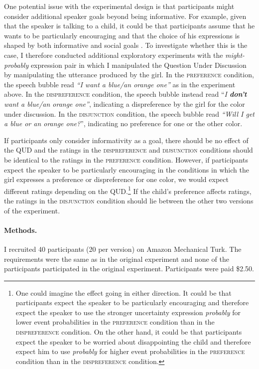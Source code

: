 One potential issue with the experimental design is that participants might consider additional speaker goals
beyond being informative. For example, given that the speaker is talking to a child, it could be that participants
assume that he wants to be particularly encouraging and that the choice of his expressions is shaped by both informative
and social goals \cite{Yoon2018}. To investigate whether this is the case, I therefore conducted additional exploratory experiments with
the \emph{might-probably} expression pair in which I manipulated the Question Under Discussion \parencite[QUD;][]{Roberts2012} by manipulating 
the utterance produced by the girl. In the \textsc{preference} condition, the speech bubble read \emph{``I want a blue/an orange one''} as in the experiment
above. In the \textsc{dispreference} condition, the speech bubble instead read ``\emph{I \textbf{don't} want a blue/an orange one''}, indicating
a dispreference by the girl for the color under discussion. In the \textsc{disjunction} condition, the speech bubble read 
\emph{``Will I get a blue or an orange one?}'', indicating no preference for one or the other color. 

If participants only consider informativity as a goal, there should be no effect of the QUD and the ratings in the 
\textsc{dispreference} and \textsc{dijsunction} conditions should be identical to the ratings 
in the \textsc{preference} condition. However, if participants expect the speaker to be particularly encouraging in the 
conditions in which the girl expresses a preference or dispreference for one color, we would expect different
ratings depending on the QUD.\footnote{One could imagine the effect going in either direction. It could be that
participants expect the speaker to be particularly encouraging and therefore expect the speaker to use 
the stronger uncertainty expression \textit{probably} for lower event probabilities in the \textsc{preference} condition than 
in the \textsc{dispreference} condition. On the other hand, it could be that participants expect the speaker to be worried about 
disappointing the child and therefore expect him to use \textit{probably} for higher event probabilities in the \textsc{preference} 
condition than in the \textsc{dispreference} condition.} If the child's preference affects ratings, the ratings in the  
\textsc{disjunction} condition should lie between the other two versions of the experiment.

\paragraph{Methods.} I recruited 40 participants (20 per version) on Amazon Mechanical Turk. 
The requirements were the same as in the original experiment and none of the participants 
participated in the original experiment. Participants were paid  \$2.50.

